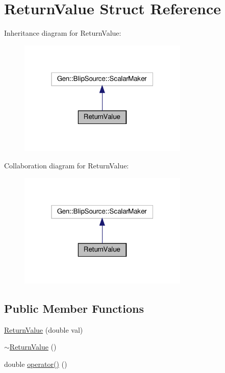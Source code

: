 \hypertarget{struct_return_value}{}\section{Return\+Value Struct Reference}
\label{struct_return_value}


Inheritance diagram for Return\+Value\+:
\nopagebreak
\begin{figure}[H]
\begin{center}
\leavevmode
\includegraphics[width=229pt]{struct_return_value__inherit__graph}
\end{center}
\end{figure}


Collaboration diagram for Return\+Value\+:
\nopagebreak
\begin{figure}[H]
\begin{center}
\leavevmode
\includegraphics[width=229pt]{struct_return_value__coll__graph}
\end{center}
\end{figure}
\subsection*{Public Member Functions}
\begin{DoxyCompactItemize}
\item 
\hyperlink{struct_return_value_a3074279ed256384587f4223a7fe0983c}{Return\+Value} (double val)
\item 
\hyperlink{struct_return_value_ada354eefee65d4309362b092f19dc86e}{$\sim$\+Return\+Value} ()
\item 
double \hyperlink{struct_return_value_a03b651a83bbd14cbd07e142ae4bdb239}{operator()} ()
\end{DoxyCompactItemize}
